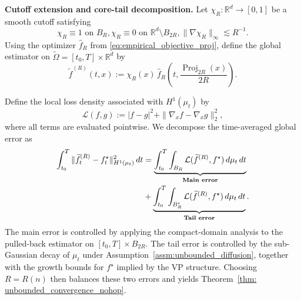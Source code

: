 \documentclass[11pt]{article}
\theoremstyle{plain}
\theoremstyle{definition}
\theoremstyle{remark}
\begin{document}
{\bf Cutoff extension and core-tail decomposition.}
Let \(\chi_R:\mathbb R^d\to[0,1]\) be a smooth cutoff satisfying
\[
\chi_R\equiv1\text{ on }B_R, \chi_R\equiv0\text{ on }\mathbb R^d\setminus B_{2R}, \|\nabla\chi_R\|_\infty\lesssim R^{-1}.
\]
Using the optimizer \(\widehat f_R\) from
\eqref{eq:empirical_objective_proj}, define the global estimator on
\(\widetilde\Omega=[t_0,T]\times\mathbb R^d\) by
\begin{equation}\label{eq:global_cutoff_estimator}
\widetilde f^{(R)}(t,x):=
\chi_R(x)\,
\widehat f_R\!\left(t,\frac{{\operatorname{Proj}_{2R}}(x)}{2R}\right).
\end{equation}

Define the local loss density associated with  \(H^1(\mu_t)\) by
\begin{equation}\label{eq:norm}
\mathcal L(f,g):=
|f-g|^2+\|\nabla_x f-\nabla_x g\|_2^2,
\end{equation}
where all terms are evaluated pointwise. We decompose the time-averaged
global error as
\begin{equation}
\label{eq:core_tail_decomp}
\begin{aligned}
\int_{t_0}^T
\|\widetilde f_t^{(R)}-f_t^\star\|_{H^1(\mu_t)}^2\,dt
&=
\underbrace{
\int_{t_0}^T
\int_{B_R}
\mathcal L(\widetilde f^{(R)},f^\star)\,d\mu_t\,dt
}_{\text{\textbf{Main error}}}\\
&+
\underbrace{
\int_{t_0}^T
\int_{B_R^c}
\mathcal L(\widetilde f^{(R)},f^\star)\,d\mu_t\,dt
}_{\text{\textbf{Tail error}}}.
\end{aligned}
\end{equation}
The main error is controlled by applying the compact-domain analysis to the
pulled-back estimator on \([t_0,T]\times B_{2R}\). The tail error is controlled by the
sub-Gaussian decay of \(\mu_t\) under Assumption~\ref{assm:unbounded_diffusion},
together with the growth bounds for \(f^\star\) implied by the VP structure.
Choosing \(R=R(n)\) then balances these two errors and yields
Theorem~\ref{thm: unbounded_convergence_nohop}.
\end{document}
